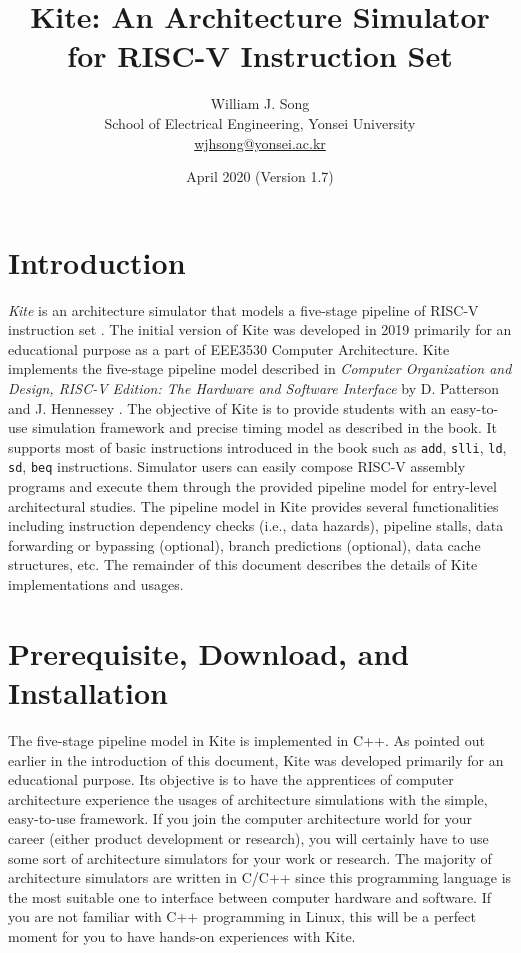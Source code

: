 \documentclass[10pt]{article}
\begin{document}
\title{Kite: An Architecture Simulator for RISC-V Instruction Set}
\author{William J. Song\\
        School of Electrical Engineering, Yonsei University\\
        \href{mailto:wjhsong@yonsei.ac.kr}{wjhsong@yonsei.ac.kr}}
\date{April 2020 (Version 1.7)}
\maketitle


\section{Introduction} \label{sec:introduction}
\emph{Kite} is an architecture simulator that models a five-stage pipeline of RISC-V instruction set \cite{waterman_riscv2019}.
The initial version of Kite was developed in 2019 primarily for an educational purpose as a part of EEE3530 Computer Architecture.
Kite implements the five-stage pipeline model described in \emph{Computer Organization and Design, RISC-V Edition: The Hardware and Software Interface} by D. Patterson and J. Hennessey \cite{patterson_morgan2017}.
The objective of Kite is to provide students with an easy-to-use simulation framework and precise timing model as described in the book.
It supports most of basic instructions introduced in the book such as {\tt add}, {\tt slli}, {\tt ld}, {\tt sd}, {\tt beq} instructions.
Simulator users can easily compose RISC-V assembly programs and execute them through the provided pipeline model for entry-level architectural studies.
The pipeline model in Kite provides several functionalities including instruction dependency checks (i.e., data hazards), pipeline stalls, data forwarding or bypassing (optional), branch predictions (optional), data cache structures, etc.
The remainder of this document describes the details of Kite implementations and usages.


\section{Prerequisite, Download, and Installation} \label{sec:install}
The five-stage pipeline model in Kite is implemented in C++.
As pointed out earlier in the introduction of this document, Kite was developed primarily for an educational purpose.
Its objective is to have the apprentices of computer architecture experience the usages of architecture simulations with the simple, easy-to-use framework.
If you join the computer architecture world for your career (either product development or research), you will certainly have to use some sort of architecture simulators for your work or research.
The majority of architecture simulators are written in C/C++ since this programming language is the most suitable one to interface between computer hardware and software.
If you are not familiar with C++ programming in Linux, this will be a perfect moment for you to have hands-on experiences with Kite.
\end{document}
